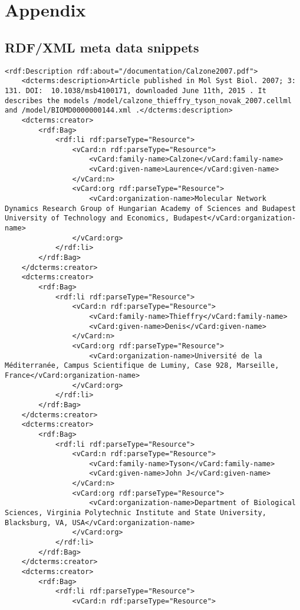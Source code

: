 \section{Appendix}
\label{sec:appendix}

\subsection{RDF/XML meta data snippets}
\label{sec:rdfmeta}
\begin{mdframed}[style=mddefault,frametitle={Meta Data of the Publication \texttt{Calzone2007.pdf}}]
\begin{verbatim}
<rdf:Description rdf:about="/documentation/Calzone2007.pdf">
	<dcterms:description>Article published in Mol Syst Biol. 2007; 3: 131. DOI:  10.1038/msb4100171, downloaded June 11th, 2015 . It describes the models /model/calzone_thieffry_tyson_novak_2007.cellml and /model/BIOMD0000000144.xml .</dcterms:description>
	<dcterms:creator>
		<rdf:Bag>
			<rdf:li rdf:parseType="Resource">
				<vCard:n rdf:parseType="Resource">
					<vCard:family-name>Calzone</vCard:family-name>
					<vCard:given-name>Laurence</vCard:given-name>
				</vCard:n>
				<vCard:org rdf:parseType="Resource">
					<vCard:organization-name>Molecular Network Dynamics Research Group of Hungarian Academy of Sciences and Budapest University of Technology and Economics, Budapest</vCard:organization-name>
				</vCard:org>
			</rdf:li>
		</rdf:Bag>
	</dcterms:creator>
	<dcterms:creator>
		<rdf:Bag>
			<rdf:li rdf:parseType="Resource">
				<vCard:n rdf:parseType="Resource">
					<vCard:family-name>Thieffry</vCard:family-name>
					<vCard:given-name>Denis</vCard:given-name>
				</vCard:n>
				<vCard:org rdf:parseType="Resource">
					<vCard:organization-name>Université de la Méditerranée, Campus Scientifique de Luminy, Case 928, Marseille, France</vCard:organization-name>
				</vCard:org>
			</rdf:li>
		</rdf:Bag>
	</dcterms:creator>
	<dcterms:creator>
		<rdf:Bag>
			<rdf:li rdf:parseType="Resource">
				<vCard:n rdf:parseType="Resource">
					<vCard:family-name>Tyson</vCard:family-name>
					<vCard:given-name>John J</vCard:given-name>
				</vCard:n>
				<vCard:org rdf:parseType="Resource">
					<vCard:organization-name>Department of Biological Sciences, Virginia Polytechnic Institute and State University, Blacksburg, VA, USA</vCard:organization-name>
				</vCard:org>
			</rdf:li>
		</rdf:Bag>
	</dcterms:creator>
	<dcterms:creator>
		<rdf:Bag>
			<rdf:li rdf:parseType="Resource">
				<vCard:n rdf:parseType="Resource">

\end{verbatim}
\end{mdframed}
